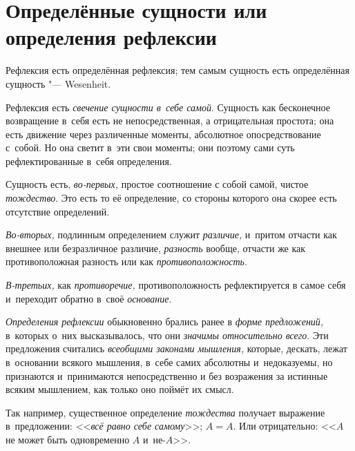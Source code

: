 \section{Определённые сущности или определения рефлексии}

Рефлексия есть определённая рефлексия; тем самым
сущность есть определённая сущность "--- Wesenheit.

Рефлексия есть {\em свечение сущности в~себе самой}.
Сущность как бесконечное возвращение в~себя есть не непосредственная, а
отрицательная простота; она есть движение через различенные моменты,
абсолютное опосредствование с~собой. Но она светит в~эти свои моменты; они
поэтому сами суть рефлектированные в~себя определения.

Сущность есть, {\em во-первых,} простое соотношение с
собой самой, чистое {\em тождество}. Это есть то её
определение, со стороны которого она скорее есть отсутствие определений.

{\em Во-вторых,} подлинным определением служит {\em различие,} и~притом
отчасти как внешнее или безразличное различие, {\em разность} вообще,
отчасти же как противоположная разность или как {\em противоположность}.

{\em В-третьих,} как {\em противоречие,} противоположность рефлектируется в
самое себя и~переходит обратно в~своё {\em основание}.


{\em Определения рефлексии} обыкновенно брались ранее в
{\em форме предложений,} в~которых о~них высказывалось,
что они {\em значимы относительно всего}. Эти
предложения считались {\em всеобщими законами
мышления,} которые, дескать, лежат в~основании всякого мышления, в~себе
самих абсолютны и~недоказуемы, но признаются и~принимаются непосредственно
и без возражения за истинные всяким мышлением, как только оно поймёт их смысл.

Так например, существенное определение {\em тождества}
получает выражение в~предложении: <<{\em всё равно себе
самому}>>; $A=A$. Или отрицательно: <<$A$ не может
быть одновременно $A$ и~не-$A$>>.

